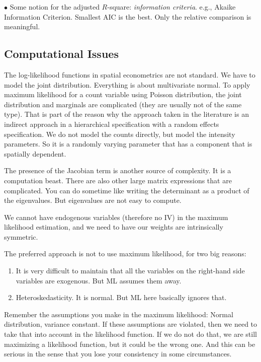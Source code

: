 \documentclass[11pt,a4paper]{amsart}
\theoremstyle{plain}
\theoremstyle{definition}
\begin{document}
$\bullet$ Some notion for the adjusted $R$-square: \textit{information criteria}. e.g., Akaike Information Criterion. Smallest AIC is the best. Only the relative comparison is meaningful. 

\subsection{Computational Issues}\hfill\par 
The log-likelihood functions in spatial econometrics are not standard. We have to model the joint distribution. Everything is about multivariate normal. To apply maximum likelihood for a count variable using Poisson distribution, the joint distribution and marginals are complicated (they are usually not of the same type). That is part of the reason why the approach taken in the literature is an indirect approach in a hierarchical specification  with a random effects specification. We do not model the counts directly, but model the intensity parameters. So it is a randomly varying parameter that has a component that is spatially dependent. 

The presence of the Jacobian term is another source of complexity. It is a computation beast. There are also other large matrix expressions that are complicated. You can do sometime like writing the determinant as a product of the eigenvalues. But eigenvalues are not easy to compute.  

We cannot have endogenous variables (therefore no IV) in the maximum likelihood estimation, and we need to have our weights are intrinsically symmetric. 

The preferred approach is not to use maximum likelihood, for two big reasons:
\begin{enumerate}
	\item It is very difficult to maintain that all the variables on the right-hand side variables are exogenous. But ML assumes them away.
	\item Heteroskedasticity. It is normal. But ML here basically ignores that.
\end{enumerate}

Remember the assumptions you make in the maximum likelihood: Normal distribution, variance constant. If these assumptions are violated, then we need to take that into account in the likelihood function. If we do not do that, we are still maximizing a likelihood function, but it could be the wrong one. And this can be serious in the sense that you lose your consistency in some circumstances.
\end{document}
